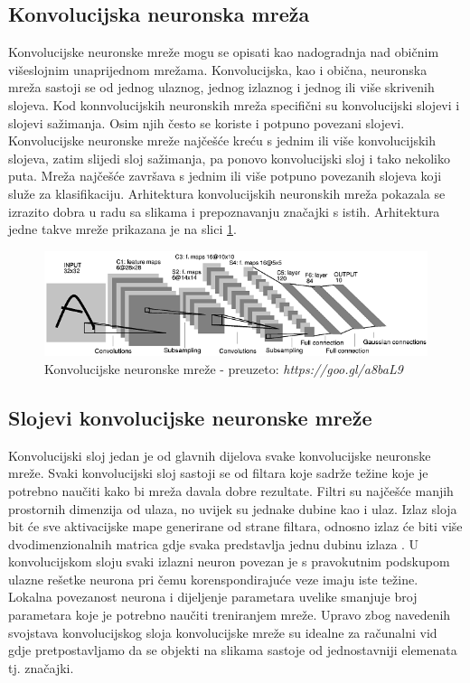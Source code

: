 \documentclass[times, utf8, zavrsni, numeric]{fer}
\begin{document}
\subsection{Konvolucijska neuronska mreža}

Konvolucijske neuronske mreže mogu se opisati kao nadogradnja nad običnim višeslojnim unaprijednom mrežama. Konvolucijska, kao i obična, neuronska mreža sastoji se od jednog ulaznog, jednog izlaznog i jednog ili više skrivenih slojeva. Kod konnvolucijskih neuronskih mreža specifični su konvolucijski slojevi i slojevi sažimanja. Osim njih često se koriste i potpuno povezani slojevi. Konvolucijske neuronske mreže najčešće kreću s jednim ili više konvolucijskih slojeva, zatim slijedi sloj sažimanja, pa ponovo konvolucijski sloj i tako nekoliko puta. Mreža najčešće završava s jednim ili više potpuno povezanih slojeva koji služe za klasifikaciju. Arhitektura konvolucijskih neuronskih mreža pokazala se izrazito dobra u radu sa slikama i prepoznavanju značajki s istih. Arhitektura jedne takve mreže prikazana je na slici \ref{fig:conv}.

\begin{figure}[htb]
    \centering
    \includegraphics[width=13cm]{images/conv.png}
    \caption{Konvolucijske neuronske mreže - preuzeto: \emph{https://goo.gl/a8baL9}}
    \label{fig:conv}
\end{figure}

\subsection{Slojevi konvolucijske neuronske mreže}

Konvolucijski sloj jedan je od glavnih dijelova svake konvolucijske neuronske mreže. Svaki konvolucijski sloj sastoji se od filtara koje sadrže težine koje je potrebno naučiti kako bi mreža davala dobre rezultate. Filtri su najčešće manjih prostornih dimenzija od ulaza, no uvijek su jednake dubine kao i ulaz. Izlaz sloja bit će sve aktivacijske mape generirane od strane filtara, odnosno izlaz će biti više dvodimenzionalnih matrica gdje svaka predstavlja jednu dubinu izlaza \citep{kopljar}. U konvolucijskom sloju svaki izlazni neuron povezan je s pravokutnim podskupom ulazne rešetke neurona pri čemu korenspondirajuće veze imaju iste težine. Lokalna povezanost neurona i dijeljenje parametara uvelike smanjuje broj parametara koje je potrebno naučiti treniranjem mreže. Upravo zbog navedenih svojstava konvolucijskog sloja konvolucijske mreže su idealne za računalni vid gdje pretpostavljamo da se objekti na slikama sastoje od jednostavniji elemenata tj. značajki.
\end{document}
